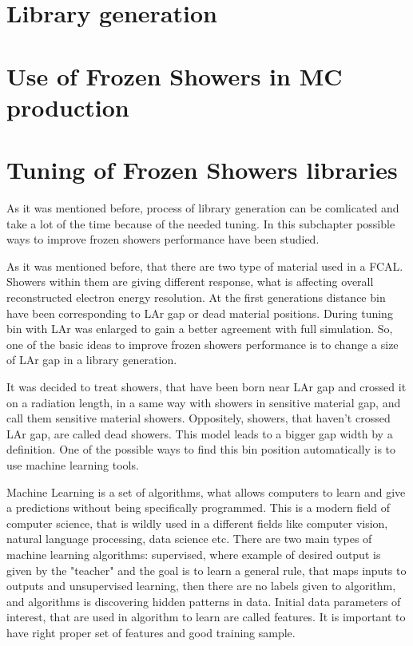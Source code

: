 \section{Library generation}
\section{Use of Frozen Showers in MC production}

\section{Tuning of Frozen Showers libraries}
As it was mentioned before, process of library generation can be comlicated and take a lot of the time because of the needed tuning. In this subchapter possible ways to improve frozen showers performance have been studied. 
\begin{figure}
\end{figure}

As it was mentioned before, that there are two type of material used in a FCAL. Showers within them are giving different response, what is affecting overall reconstructed electron energy resolution.  At the first generations distance bin have been corresponding to LAr gap or dead material positions. During tuning bin with LAr was enlarged to gain a better agreement with full simulation. So, one of the basic ideas to improve frozen showers performance is to change a size of LAr gap in a library generation. 

It was decided to treat showers, that have been born near LAr gap and crossed it on a radiation length, in a same way with showers in sensitive material gap, and call them sensitive material showers. Oppositely, showers, that haven't crossed LAr gap, are called dead showers. This model leads to a bigger gap width by a definition. One of the possible ways to find this bin position automatically is to use machine learning tools. 

Machine Learning is a set of algorithms, what allows computers to learn and give a predictions without being specifically programmed. This is a modern field of computer science, that is wildly used in a different fields like computer vision, natural language processing, data science etc. There are two main types of machine learning algorithms: supervised, where example of desired output is given by the "teacher" and the goal is to learn a general rule, that maps inputs to outputs and unsupervised learning, then there are no labels given to algorithm, and algorithms is discovering hidden patterns in data. Initial data parameters of interest, that are used in algorithm to learn are called features. It is important to have right proper set of features and good training sample. 

